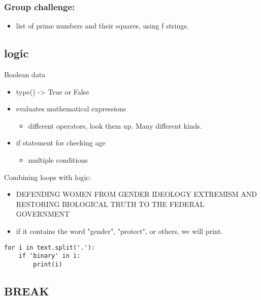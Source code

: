 \documentclass[11pt]{article}
\begin{document}
\subsubsection{Group challenge:}
\label{sec:org96532d4}
\begin{itemize}
\item list of prime numbers and their squares, using f strings.
\end{itemize}

\subsection{logic}
\label{sec:orge6c9b26}
Boolean data
\begin{itemize}
\item type() -> True or False
\item evaluates mathematical expressions
\begin{itemize}
\item different operators, look them up. Many different kinds.
\end{itemize}
\item if statement for checking age
\begin{itemize}
\item multiple conditions
\end{itemize}
\end{itemize}

Combining loops with logic:
\begin{itemize}
\item DEFENDING WOMEN FROM GENDER IDEOLOGY EXTREMISM AND RESTORING
BIOLOGICAL TRUTH TO THE FEDERAL GOVERNMENT
\item if it contains the word "gender", "protect", or others, we will
print.
\end{itemize}

\begin{verbatim}
for i in text.split('.'):
    if 'binary' in i:
        print(i)
\end{verbatim}

\subsection{BREAK}
\label{sec:orgdc856a3}
\end{document}
